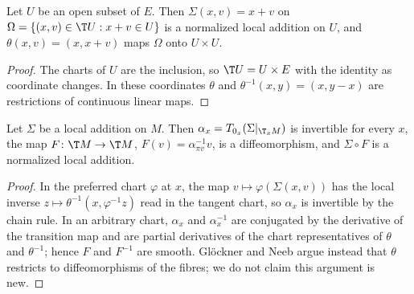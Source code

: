 \begin{proposition}
  \label{prop:open-local-addition}
  \leanok
  Let $U$ be an open subset of $E$. Then $\Sigma(x, v) = x + v$ on
  $\Omega = \{(x, v) \in \T U : x + v \in U\}$ is a normalized local addition on $U$, and
  $\theta(x, v) = (x, x + v)$ maps $\Omega$ onto $U \times U$.
\end{proposition}

\begin{proof}
  \leanok
  The charts of $U$ are the inclusion, so $\T U = U \times E$ with the identity as coordinate
  changes. In these coordinates $\theta$ and $\theta^{-1}(x, y) = (x, y - x)$ are restrictions
  of continuous linear maps.
\end{proof}

\begin{proposition}
  \label{prop:normalize-local-addition}
  \leanok
  Let $\Sigma$ be a local addition on $M$. Then $\alpha_x = T_{0_x}(\Sigma|_{\T_x M})$ is
  invertible for every $x$, the map $F \colon \T M \to \T M$, $F(v) = \alpha_{\pi v}^{-1} v$, is a
  diffeomorphism, and $\Sigma \circ F$ is a normalized local addition.
\end{proposition}

\begin{proof}
  \leanok
  In the preferred chart $\varphi$ at $x$, the map $v \mapsto \varphi(\Sigma(x, v))$ has the local
  inverse $z \mapsto \theta^{-1}(x, \varphi^{-1} z)$ read in the tangent chart, so $\alpha_x$ is
  invertible by the chain rule. In an arbitrary chart, $\alpha_x$ and $\alpha_x^{-1}$ are
  conjugated by the derivative of the transition map and are partial derivatives of the chart
  representatives of $\theta$ and $\theta^{-1}$; hence $F$ and $F^{-1}$ are smooth. Glöckner and
  Neeb argue instead that $\theta$ restricts to diffeomorphisms of the fibres; we do not claim
  this argument is new.
\end{proof}

